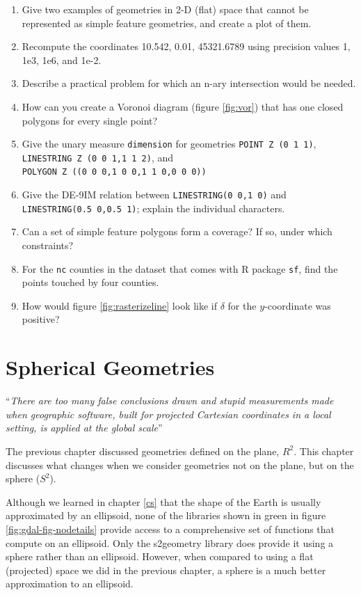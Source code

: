\documentclass[]{book}
\providecommand{\tightlist}{%
  \setlength{\itemsep}{0pt}\setlength{\parskip}{0pt}}
\begin{document}
\begin{enumerate}
\def\labelenumi{\arabic{enumi}.}
\tightlist
\item
  Give two examples of geometries in 2-D (flat) space that cannot be represented as simple feature geometries, and create a plot of them.
\item
  Recompute the coordinates 10.542, 0.01, 45321.6789 using precision values 1, 1e3, 1e6, and 1e-2.
\item
  Describe a practical problem for which an n-ary intersection would be needed.
\item
  How can you create a Voronoi diagram (figure \ref{fig:vor}) that has one closed polygons for every single point?
\item
  Give the unary measure \texttt{dimension} for geometries \texttt{POINT\ Z\ (0\ 1\ 1)}, \texttt{LINESTRING\ Z\ (0\ 0\ 1,1\ 1\ 2)}, and \texttt{POLYGON\ Z\ ((0\ 0\ 0,1\ 0\ 0,1\ 1\ 0,0\ 0\ 0))}
\item
  Give the DE-9IM relation between \texttt{LINESTRING(0\ 0,1\ 0)} and \texttt{LINESTRING(0.5\ 0,0.5\ 1)}; explain the individual characters.
\item
  Can a set of simple feature polygons form a coverage? If so, under which constraints?
\item
  For the \texttt{nc} counties in the dataset that comes with R package \texttt{sf}, find the points touched by four counties.
\item
  How would figure \ref{fig:rasterizeline} look like if \(\delta\) for the \(y\)-coordinate was positive?
\end{enumerate}

\hypertarget{spherical}{%
\chapter{Spherical Geometries}\label{spherical}}

``\emph{There are too many false conclusions drawn and stupid measurements
made when geographic software, built for projected Cartesian
coordinates in a local setting, is applied at the global scale}''
\citep{chrisman}

The previous chapter discussed geometries defined on the plane,
\(R^2\). This chapter discusses what changes when we consider
geometries not on the plane, but on the sphere (\(S^2\)).

Although we learned in chapter \ref{cs} that the shape of the Earth
is usually approximated by an ellipsoid, none of the libraries shown
in green in figure \ref{fig:gdal-fig-nodetails} provide access
to a comprehensive set of functions that compute on an ellipsoid.
Only the s2geometry \citep{R-s2, s2geometry} library does provide it
using a sphere rather than an ellipsoid. However, when compared
to using a flat (projected) space we did in the previous chapter,
a sphere is a much better approximation to an ellipsoid.
\end{document}
